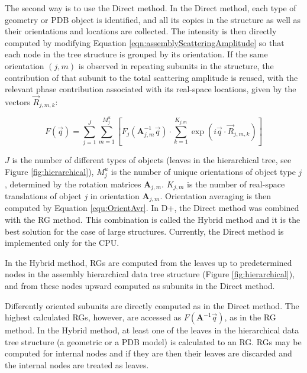 \documentclass[../D+Manual.tex]{subfiles}
\begin{document}
The second way is to use the Direct method. In the Direct method, each type of geometry or PDB object is identified, and all its copies in the structure as well as their orientations and locations are collected. The intensity is then directly computed by modifying  Equation \ref{eqn:assemblyScatteringAmplitude}
so that each node in the tree structure is grouped by its orientation. If the same orientation $(j,m)$ is observed in repeating subunits in the structure, the contribution of that subunit to the total scattering amplitude is reused, with the relevant phase contribution associated with its real-space locations, given by the vectors $\vec{R}_{j,m,k}$:
	
	\begin{equation}
	\label{eqn:assemblyScatteringAmplitudeMainText}
	F\left(\vec{q}\right)=
	\sum_{j=1}^{J}
	\sum_{m=1}^{M^u_j}
	\left[F_{j}\left(\mathbf{A}_{j,m}^{-1}\vec{q}\right)\cdot
	\sum_{k=1}^{K_{j,m}}\exp\left(i\vec{q}\cdot\vec{R}_{j,m,k}\right)\right]
	\end{equation}
	
	\noindent $J$ is the number of different types of objects (leaves in the hierarchical tree, see Figure \ref{fig:hierarchical}), $M^u_j$ is the number of unique orientations of object type $j$, determined by the rotation matrices  $\mathbf{A}_{j,m}$. $K_{j,m}$ is the number of  real-space translations of object $j$ in orientation $\mathbf{A}_{j,m}$. Orientation averaging is then computed by Equation \ref{equ:OrientAvr}. In D+, the Direct method was combined with  the RG method. This combination is called the Hybrid method and it is the best solution for the case of large structures. Currently, the Direct method is implemented only for the CPU. 
	
	In the Hybrid method, RGs are computed from the leaves up to predetermined nodes in the assembly hierarchical data tree structure (Figure \ref{fig:hierarchical}), and from these nodes upward computed as subunits in the Direct method. 
	
	Differently oriented
	subunits are directly computed as in the Direct method. The highest
	calculated RGs, however, are accessed as $F\left(\mathbf{A}^{-1}\vec{q}\right)$, as in the RG method. In the Hybrid method, at least one of the leaves
	in the hierarchical data tree structure (a geometric or a PDB model) is calculated
	to an RG. RGs may be computed for internal nodes and if they are then their
	leaves are discarded and the internal nodes are treated as leaves.
	
\end{document}
